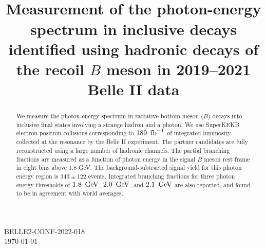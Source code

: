\documentclass[preprint,aps,prd,longbibliography,tightenlines,linenumbers,toc=flat]{revtex4-2}
\begin{document}
\def\belletwo {\it {Belle II}}



\vspace*{-3\baselineskip}

\vspace*{-5\baselineskip}
\begin{flushright}
BELLE2-CONF-2022-018\\
\today
\end{flushright}


\title {\quad\\[0.5cm] Measurement of the photon-energy spectrum in inclusive \BtoXsgamma decays identified using hadronic decays of the recoil $B$ meson in 2019–2021 Belle II data}






\begin{abstract}

We measure the photon-energy spectrum in radiative bottom-meson ($B$) decays into inclusive final states involving a strange hadron and a photon. We use SuperKEKB electron-positron collisions corresponding to $189~\mbox{\,fb}^{-1}$ of integrated luminosity collected at the \FourS resonance by the Belle II experiment. The partner \B candidates are fully reconstructed using a large number of hadronic channels. The \BtoXsgamma partial branching fractions are measured as a function of photon energy in the signal $B$ meson rest frame in eight bins above 1.8 GeV. The background-subtracted signal yield for this photon energy region is $343 \pm 122$ events. Integrated branching fractions for three photon energy thresholds of $1.8~\mathrm{\,Ge\kern -0.1em V}$, $2.0~\mathrm{\,Ge\kern -0.1em V}$, and $2.1~\mathrm{\,Ge\kern -0.1em V}$ are also reported, and found to be in agreement with world averages.

\end{abstract}
\end{document}

